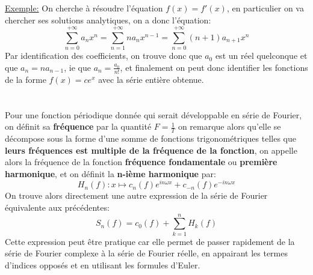 \uline{Exemple:} On cherche à résoudre l'équation \(f(x) = f'(x)\), en particulier on va chercher ses solutions analytiques, on a donc l'équation:
\[
   \sum_{n=0}^{+\infty}a_nx^n = \sum_{n=1}^{+\infty}na_nx^{n-1} = \sum_{n=0}^{+\infty}(n+1)a_{n+1}x^{n}
\]
Par identification des coefficients, on trouve donc que \(a_0\) est un réel quelconque et que \(a_n = na_{n-1}\), ie que \(a_n = \frac{a_0}{n!}\), et finalement on peut donc identifier les fonctions de la forme \(f(x) = ce^x\) avec la série entière obtenue.
\chapter*{}

\subsection*{}
Pour une fonction périodique donnée qui serait développable en série de Fourier, on définit sa \textbf{fréquence} par la quantité \(F = \frac{1}{T}\) on remarque alors qu'elle se décompose sous la forme d'une somme de fonctions trigonométriques telles que \textbf{leurs fréquences est multiple de la fréquence de la fonction}, on appelle alors la fréquence de la fonction \textbf{fréquence fondamentale} ou \textbf{première harmonique}, et on définit la \textbf{n-ième harmonique} par:
\[
   H_n(f) : x \longmapsto c_n(f)e^{in\omega x} + c_{-n}(f)e^{-in\omega x}  
\]
On trouve alors directement une autre expression de la série de Fourier équivalente aux précédentes:
\[
   S_n(f) = c_0(f) + \sum_{k=1}^{n} H_k(f)
\] 
Cette expression peut être pratique car elle permet de passer rapidement de la série de Fourier complexe à la série de Fourier réelle, en appairant les termes d'indices opposés et en utilisant les formules d'Euler.
\pagebreak
